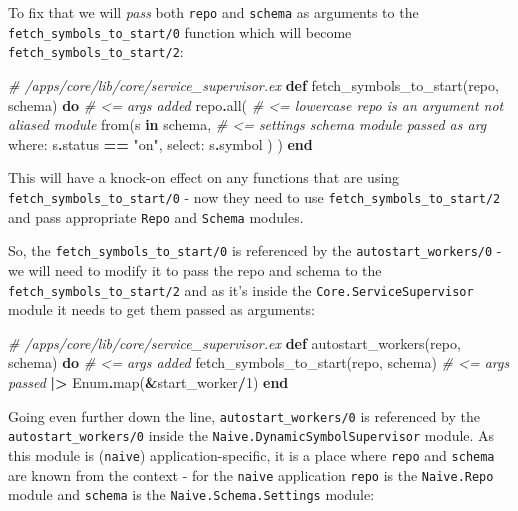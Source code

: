 \documentclass[
]{book}
\newenvironment{Shaded}{\begin{snugshade}}{\end{snugshade}}
\newcommand{\CommentTok}[1]{\textcolor[rgb]{0.56,0.35,0.01}{\textit{#1}}}
\newcommand{\ConstantTok}[1]{\textcolor[rgb]{0.00,0.00,0.00}{#1}}
\newcommand{\DecValTok}[1]{\textcolor[rgb]{0.00,0.00,0.81}{#1}}
\newcommand{\KeywordTok}[1]{\textcolor[rgb]{0.13,0.29,0.53}{\textbf{#1}}}
\newcommand{\NormalTok}[1]{#1}
\newcommand{\OperatorTok}[1]{\textcolor[rgb]{0.81,0.36,0.00}{\textbf{#1}}}
\newcommand{\StringTok}[1]{\textcolor[rgb]{0.31,0.60,0.02}{#1}}
\newcommand{\VariableTok}[1]{\textcolor[rgb]{0.00,0.00,0.00}{#1}}
\begin{document}
To fix that we will \emph{pass} both \texttt{repo} and \texttt{schema} as arguments to the \texttt{fetch\_symbols\_to\_start/0} function which will become \texttt{fetch\_symbols\_to\_start/2}:

\begin{Shaded}
\begin{Highlighting}[]
  \CommentTok{\# /apps/core/lib/core/service\_supervisor.ex}
  \KeywordTok{def}\NormalTok{ fetch\_symbols\_to\_start(repo, schema) }\KeywordTok{do} \CommentTok{\# \textless{}= args added}
\NormalTok{    repo}\OperatorTok{.}\NormalTok{all( }\CommentTok{\# \textless{}= lowercase \textasciigrave{}repo\textasciigrave{} is an argument not aliased module}
\NormalTok{      from(s }\KeywordTok{in}\NormalTok{ schema, }\CommentTok{\# \textless{}= settings schema module passed as arg}
        \VariableTok{where:}\NormalTok{ s}\OperatorTok{.}\NormalTok{status }\OperatorTok{==} \StringTok{"on"}\NormalTok{,}
        \VariableTok{select:}\NormalTok{ s}\OperatorTok{.}\NormalTok{symbol}
\NormalTok{      )}
\NormalTok{    )}
  \KeywordTok{end}
\end{Highlighting}
\end{Shaded}

This will have a knock-on effect on any functions that are using \texttt{fetch\_symbols\_to\_start/0} - now they need to use \texttt{fetch\_symbols\_to\_start/2} and pass appropriate \texttt{Repo} and \texttt{Schema} modules.

So, the \texttt{fetch\_symbols\_to\_start/0} is referenced by the \texttt{autostart\_workers/0} - we will need to modify it to pass the repo and schema to the \texttt{fetch\_symbols\_to\_start/2} and as it's inside the \texttt{Core.ServiceSupervisor} module it needs to get them passed as arguments:

\begin{Shaded}
\begin{Highlighting}[]
  \CommentTok{\# /apps/core/lib/core/service\_supervisor.ex}
  \KeywordTok{def}\NormalTok{ autostart\_workers(repo, schema) }\KeywordTok{do} \CommentTok{\# \textless{}= args added}
\NormalTok{    fetch\_symbols\_to\_start(repo, schema) }\CommentTok{\# \textless{}= args passed}
    \OperatorTok{|\textgreater{}} \ConstantTok{Enum}\OperatorTok{.}\NormalTok{map(}\OperatorTok{\&}\NormalTok{start\_worker}\OperatorTok{/}\DecValTok{1}\NormalTok{)}
  \KeywordTok{end}
\end{Highlighting}
\end{Shaded}

Going even further down the line, \texttt{autostart\_workers/0} is referenced by the \texttt{autostart\_workers/0} inside the \texttt{Naive.DynamicSymbolSupervisor} module. As this module is (\texttt{naive}) application-specific, it is a place where \texttt{repo} and \texttt{schema} are known from the context - for the \texttt{naive} application \texttt{repo} is the \texttt{Naive.Repo} module and \texttt{schema} is the \texttt{Naive.Schema.Settings} module:
\end{document}
